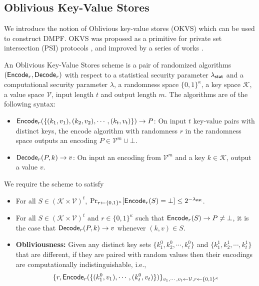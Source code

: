 \subsection{Oblivious Key-Value Stores}\label{sec:prelim_okvs}
We introduce the notion of Oblivious key-value stores (OKVS) which can be used to construct DMPF. OKVS was proposed as a primitive for private set intersection (PSI) protocols \cite{cryptoeprint:2021/883}, and improved by a series of works \cite{cryptoeprint:2022/320,cryptoeprint:2023/903}. 
\begin{definition}\label{def:OKVS}
  An Oblivious Key-Value Stores scheme is a pair of randomized algorithms $({\sf Encode}_r,{\sf Decode}_r)$ with respect to a statistical security parameter $\lambda_{\sf stat}$ and a computational security parameter $\lambda$, a randomness space $\{0,1\}^\kappa$, a key space $\mathcal{K}$, a value space $\mathcal{V}$, input length $t$ and output length $m$. The algorithms are of the following syntax: 
  \begin{itemize}
    \item ${\sf Encode}_r(\{(k_1,v_1),(k_2,v_2),\cdots,(k_t,v_t)\})\rightarrow P$: On input $t$ key-value pairs with distinct keys, the encode algorithm with randomness $r$ in the randomness space outputs an encoding $P\in\mathcal{V}^m\cup\bot$.
    \item ${\sf Decode}_r(P,k)\rightarrow v$: On input an encoding from $\mathcal{V}^m$ and a key $k\in\mathcal{K}$, output a value $v$. 
  \end{itemize}
  We require the scheme to satisfy
  \begin{itemize}
    \item For all $S\in(\mathcal{K}\times\mathcal{V})^t$, $\Pr_{r\leftarrow\{0,1\}^\kappa}[{\sf Encode}_r(S)=\bot]\le 2^{-\lambda_{\sf stat}}$. 
    \item For all $S\in(\mathcal{K}\times \mathcal{V})^t$ and $r\in \{0,1\}^\kappa$ such that ${\sf Encode}_r(S)\rightarrow P\not=\bot$, it is the case that ${\sf Decode}_r(P,k)\rightarrow v$ whenever $(k,v)\in S$. 
    \item \textbf{Obliviousness: }Given any distinct key sets $\{k_1^0,k_2^0,\cdots,k_t^0\}$ and $\{k_1^1,k_2^1,\cdots,k_t^1\}$ that are different, if they are paired with random values then their encodings are computationally indistinguishable, i.e., 
  \begin{align*}
    &\{r, \Encode_r(\{(k_1^0,v_1),\cdots,(k_t^0,v_t)\})\}_{v_1,\cdots,v_t\leftarrow \mathcal{V},r\leftarrow\{0,1\}^\kappa}\\

\end{align*}
\end{itemize}
\end{definition}
